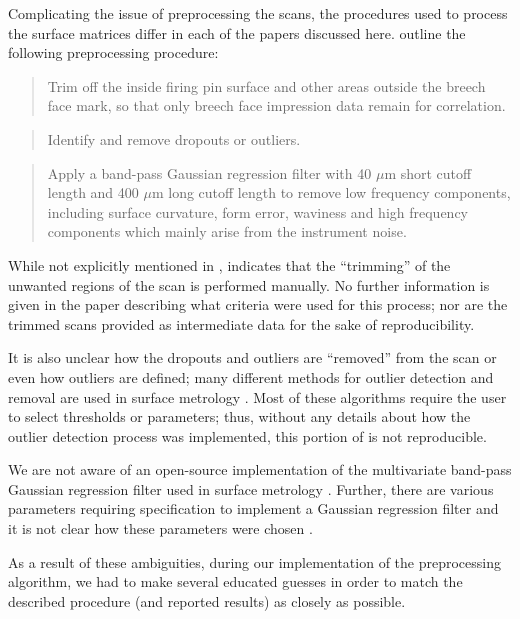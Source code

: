 Complicating the issue of preprocessing the scans, the procedures used
to process the surface matrices differ in each of the papers discussed
here. \citet{song_3d_2014} outline the following preprocessing
procedure:

\begin{quote}
Trim off the inside firing pin surface and other areas outside the
breech face mark, so that only breech face impression data remain for
correlation.
\end{quote}

\begin{quote}
Identify and remove dropouts or outliers.
\end{quote}

\begin{quote}
Apply a band-pass Gaussian regression filter with 40 \(\mu\)m short
cutoff length and 400 \(\mu\)m long cutoff length to remove low
frequency components, including surface curvature, form error, waviness
and high frequency components which mainly arise from the instrument
noise.
\end{quote}

While not explicitly mentioned in \citet{song_3d_2014},
\citet{song_estimating_2018} indicates that the ``trimming'' of the
unwanted regions of the scan is performed manually. No further
information is given in the paper describing what criteria were used for
this process; nor are the trimmed scans provided as intermediate data
for the sake of reproducibility.

It is also unclear how the dropouts and outliers are ``removed'' from
the scan or even how outliers are defined; many different methods for
outlier detection and removal are used in surface metrology
\citep{outlierdetection}. Most of these algorithms require the user to
select thresholds or parameters; thus, without any details about how the
outlier detection process was implemented, this portion of
\citet{song_3d_2014} is not reproducible.

We are not aware of an open-source implementation of the multivariate
band-pass Gaussian regression filter used in surface metrology
\citep{ISO16610-71}. Further, there are various parameters requiring
specification to implement a Gaussian regression filter and it is not
clear how these parameters were chosen
\citep{brinkman_bodschwinna_2003}.

As a result of these ambiguities, during our implementation of the
preprocessing algorithm, we had to make several educated guesses in
order to match the described procedure (and reported results) as closely
as possible.

